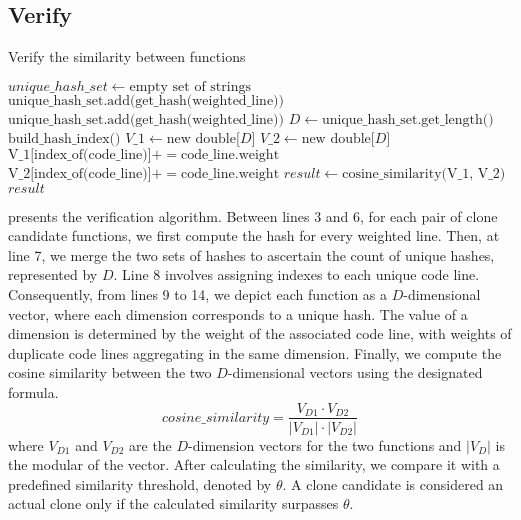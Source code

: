 \subsection{Verify}\label{sec:verify}
\begin{algorithm}[h]
\caption{Verify the similarity between functions}\label{alg:verify}
\begin{algorithmic}[1]
    \State $unique\_hash\_set \gets \text{empty set of strings}$
        \State $\text{unique\_hash\_set.{add(get\_hash(weighted\_line))}}$
    \EndFor
        \State $\text{unique\_hash\_set.add(get\_hash(weighted\_line))}$
    \EndFor
    \State $D \gets \text{unique\_hash\_set.get\_length()}$
    \State $\text{build\_hash\_index()}$
    \State ${V\_1} \gets \text{new double[$D$]}$
    \State ${V\_2} \gets \text{new double[$D$]}$
        \State $\text{V\_1[index\_of(code\_line)]} \mathrel{{+}{=}} \text{code\_line.weight}$
    \EndFor
        \State $\text{V\_2[index\_of(code\_line)]} \mathrel{{+}{=}} \text{code\_line.weight}$
    \EndFor
    \State ${result} \gets \text{cosine\_similarity(V\_1, V\_2)}$
    \State \Return ${result}$
\EndFunction
\end{algorithmic}
\end{algorithm}
 presents the verification algorithm. Between lines 3 and 6, for each pair of clone candidate functions, we first compute the hash for every weighted line. Then, at line 7, we merge the two sets of hashes to ascertain the count of unique hashes, represented by $D$. Line 8 involves assigning indexes to each unique code line. Consequently, from lines 9 to 14, we depict each function as a $D$-dimensional vector, where each dimension corresponds to a unique hash. The value of a dimension is determined by the weight of the associated code line, with weights of duplicate code lines aggregating in the same dimension. Finally, we compute the cosine similarity between the two $D$-dimensional vectors using the designated formula.
$$
cosine\_similarity = \frac{V_{D1}\cdot V_{D2}}{|V_{D1}|\cdot |V_{D2}|}
$$
where $V_{D1}$ and $V_{D2}$ are the $D$-dimension vectors for the two functions and $|V_{D}|$ is the modular of the vector. After calculating the similarity, we compare it with a predefined similarity threshold, denoted by $\theta$. A clone candidate is considered an actual clone only if the calculated similarity surpasses $\theta$.

